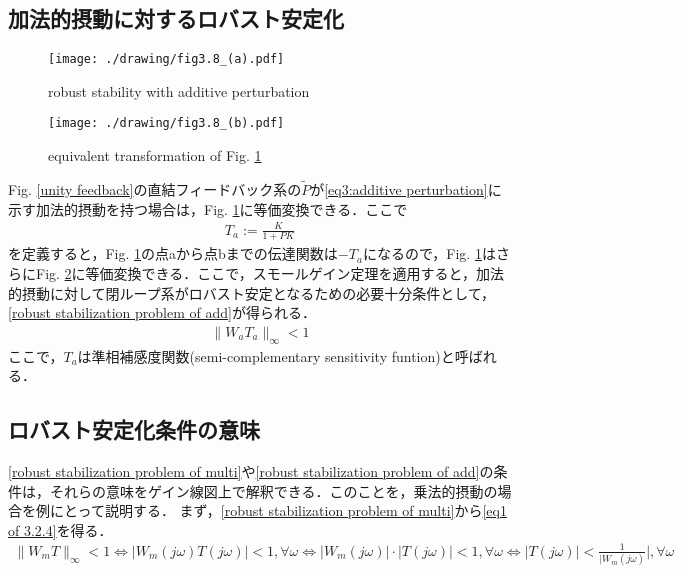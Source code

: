 \documentclass[a4paper,11pt,uplatex]{jsarticle} %
\theoremstyle{definition}	%
\newcommand{\figref}[1]{Fig. \ref{#1}}
\begin{document}
{\subsection{加法的摂動に対するロバスト安定化}
\begin{figure}[t]
\centering
\texttt{[image: ./drawing/fig3.8\_(a).pdf]}
\caption{robust stability with additive perturbation}
\label{robust stablity with additive perturbation}
\end{figure}
\begin{figure}[t]
\centering
\texttt{[image: ./drawing/fig3.8\_(b).pdf]}
\caption{equivalent transformation of \figref{robust stablity with additive perturbation}}
\label{fig3.8(b)}
\end{figure}

\figref{unity feedback}の直結フィードバック系の$ \tilde{P} $が\eqref{eq3:additive perturbation}に示す加法的摂動を持つ場合は，\figref{robust stablity with additive perturbation}に等価変換できる．ここで
\begin{align}
\label{def: defenition of T_a}
T_a := \frac{K}{ 1 + PK }
\end{align}
を定義すると，\figref{robust stablity with additive perturbation}の点aから点bまでの伝達関数は$- T_a $になるので，\figref{robust stablity with additive perturbation}はさらに\figref{fig3.8(b)}に等価変換できる．ここで，スモールゲイン定理を適用すると，加法的摂動に対して閉ループ系がロバスト安定となるための必要十分条件として，\eqref{robust stabilization problem of add}が得られる．
\begin{align}
\label{robust stabilization problem of add}
\| W_a T_a \|_\infty < 1 
\end{align}
ここで，$T_a$は準相補感度関数(semi-complementary sensitivity funtion)と呼ばれる．

\subsection{ロバスト安定化条件の意味}
\eqref{robust stabilization problem of multi}や\eqref{robust stabilization problem of add}の条件は，それらの意味をゲイン線図上で解釈できる．このことを，乗法的摂動の場合を例にとって説明する．
まず，\eqref{robust stabilization problem of multi}から\eqref{eq1 of 3.2.4}を得る．
\begin{align}
\label{eq1 of 3.2.4}
\| W_m T \|_\infty < 1 \Leftrightarrow | W_m(j \omega ) T(j \omega ) | < 1 , \forall \omega \Leftrightarrow | W_m(j \omega) | \cdot | T(j \omega ) | < 1 , \forall \omega \Leftrightarrow | T(j \omega) | < \frac{1}{| W_m (j \omega)} |, \forall \omega
\end{align}

}
\end{document}
